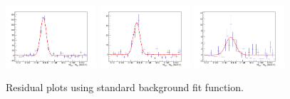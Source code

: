 \begin{figure}[!h]
\begin{center}
\includegraphics[width=0.3\textwidth]{figures/Dstar/pp13TeV/multi_trial/residual_plot_std_bkg_func_16-24GeV.png} 
\includegraphics[width=0.3\textwidth]{figures/Dstar/pp13TeV/multi_trial/residual_plot_std_bkg_func_24-36GeV.png}
\includegraphics[width=0.3\textwidth]{figures/Dstar/pp13TeV/multi_trial/residual_plot_std_bkg_func_36-50GeV.png} 

\caption{Residual plots using standard background fit function.}
\label{fig:DstarYield_stdbkg_residual}
\end{center}
\end{figure}


